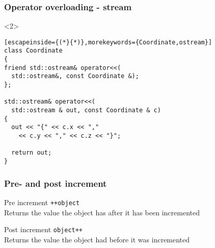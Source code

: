 \documentclass[14pt,a4paper,dvipsnames,usenames]{beamer}
\begin{document}
\begin{frame}[fragile]
  \frametitle{Operator overloading - stream}


  \begin{onlyenv}<2>
  \begin{lstlisting}[escapeinside={(*}{*)},morekeywords={Coordinate,ostream}]
class Coordinate
{
friend std::ostream& operator<<(
  std::ostream&, const Coordinate &);
};

std::ostream& operator<<(
  std::ostream & out, const Coordinate & c)
{
  out << "{" << c.x << ","
    << c.y << "," << c.z << "}";
  
  return out;
}
  \end{lstlisting}
  \end{onlyenv}
  
\end{frame}

\begin{frame}[fragile]
  \frametitle{Pre- and post increment}

  {\large Pre increment} \; \lstinline!++object!\\[5pt]
  Returns the value the object has {\color{FeebleWeek}after} it has been incremented


  \vspace{1em}
  {\large Post increment} \; \lstinline!object++!\\[5pt]
  Returns the value the object had {\color{Marty}before} it was incremented
  
\end{frame}
\end{document}
